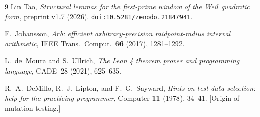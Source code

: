 \documentclass[11pt,a4paper]{amsart}
\theoremstyle{plain}
\theoremstyle{definition}
\begin{document}
\begin{thebibliography}{9}
Lin Tao, \emph{Structural lemmas for the first-prime window of the Weil
quadratic form}, preprint v1.7 (2026).
\texttt{doi:10.5281/zenodo.21847941}.

F.~Johansson, \emph{Arb: efficient arbitrary-precision midpoint-radius interval
arithmetic}, IEEE Trans.\ Comput.\ \textbf{66} (2017), 1281--1292.

L.~de~Moura and S.~Ullrich, \emph{The Lean 4 theorem prover and programming
language}, CADE~28 (2021), 625--635.

R.~A.~DeMillo, R.~J.~Lipton, and F.~G.~Sayward, \emph{Hints on test data
selection: help for the practicing programmer}, Computer \textbf{11} (1978),
34--41. [Origin of mutation testing.]
\end{thebibliography}
\end{document}
